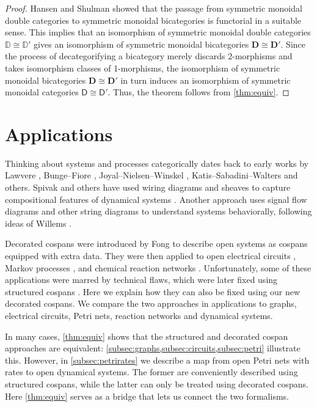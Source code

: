 \documentclass[reqno]{amsart}
\theoremstyle{definition}
\theoremstyle{remark}
\newcommand{\D}{\mathsf{D}}
\newcommand{\bicat}{\mathbf}
\newcommand{\bD}{\bicat{D}}
\newcommand{\double}[1]{\mathbf{\mathbb #1}}
\newcommand{\lD}{\double{D}}
\begin{document}
\begin{proof} 
Hansen and Shulman \cite{HS} showed that the passage from symmetric monoidal double categories to symmetric monoidal bicategories is functorial in a suitable sense.  This implies that an isomorphism of symmetric monoidal double categories $\lD \cong \lD'$ gives an isomorphism of symmetric monoidal bicategories $\bD \cong \bD'$.    Since the process of decategorifying a bicategory merely discards 2-morphisms and takes isomorphism classes of 1-morphisms, the isomorphism of symmetric monoidal bicategories $\bD \cong \bD'$ in turn induces an isomorphism of symmetric monoidal categories $\D \cong \D'$.   Thus, the theorem follows from \cref{thm:equiv}. \end{proof}

\section{Applications}\label{Applications}

Thinking about systems and processes categorically dates back to early works by Lawvere \cite{Lawvere}, Bunge--Fiore \cite{BungeFiore}, Joyal--Nielsen--Winskel \cite{JNW}, Katis--Sabadini--Walters \cite{KSW} and others.   Spivak and others have used wiring diagrams and sheaves to capture compositional features of dynamical systems \cite{BFV,SSV,VSL}.  Another approach uses signal flow diagrams and other string diagrams \cite{BE,BSZ,FRS} to understand systems behaviorally, following ideas of Willems \cite{Willems}.  
 
Decorated cospans were introduced by Fong \cite{Fong,FongThesis} to describe open systems as cospans equipped with extra data.  They were then applied to open electrical circuits \cite{BF}, Markov processes \cite{BFP}, and chemical reaction networks \cite{BP}.  Unfortunately, some of these applications were marred by technical flaws, which were later fixed using structured cospans \cite{BC}. Here we explain how they can also be fixed using our new decorated cospans.  We compare the two approaches in applications to graphs, electrical circuits, Petri nets, reaction networks and dynamical systems. 

In many cases, \cref{thm:equiv} shows that the structured and decorated cospan approaches are equivalent: \cref{subsec:graphs,subsec:circuits,subsec:petri} illustrate this.   However, in \cref{subsec:petrirates} we describe a map from open Petri nets with rates to open dynamical systems.  The former are conveniently described using structured cospans, while the latter can only be treated using decorated cospans.   Here \cref{thm:equiv} serves as a bridge that lets us connect the two formalisms.
\end{document}
